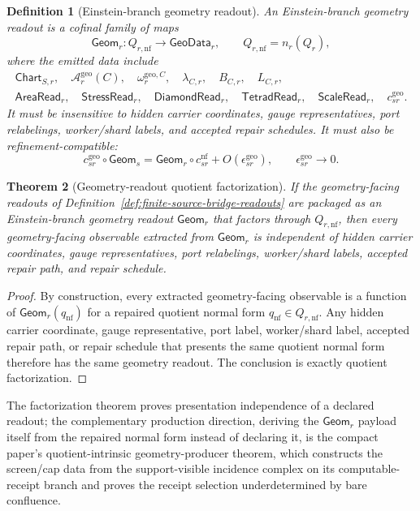 \documentclass[11pt]{article}
\newtheorem{theorem}{Theorem}[section]
\newtheorem{definition}[theorem]{Definition}
\theoremstyle{remark}
\theoremstyle{plain}
\begin{document}
\begin{definition}[Einstein-branch geometry readout]\label{def:einstein-branch-geometry-readout}
An Einstein-branch geometry readout is a cofinal family of maps
\[
\mathsf{Geom}_r:Q_{r,\mathrm{nf}}\to \mathsf{GeoData}_r,
\qquad
Q_{r,\mathrm{nf}}=n_r(Q_r),
\]
where the emitted data include
\[
\begin{gathered}
\mathsf{Chart}_{S,r},\quad
\mathcal A^{\mathrm{geo}}_{r}(C),\quad
\omega^{\mathrm{geo},C}_{r},\quad
\lambda_{C,r},\quad B_{C,r},\quad L_{C,r},\\
\mathsf{AreaRead}_r,\quad
\mathsf{StressRead}_r,\quad
\mathsf{DiamondRead}_r,\quad
\mathsf{TetradRead}_r,\quad
\mathsf{ScaleRead}_r,\quad
c^{\mathrm{geo}}_{sr}.
\end{gathered}
\]
It must be insensitive to hidden carrier coordinates, gauge representatives,
port relabelings, worker/shard labels, and accepted repair schedules. It must
also be refinement-compatible:
\[
c^{\mathrm{geo}}_{sr}\circ \mathsf{Geom}_s
=
\mathsf{Geom}_r\circ c^{\mathrm{nf}}_{sr}
+O(\epsilon^{\mathrm{geo}}_{sr}),
\qquad
\epsilon^{\mathrm{geo}}_{sr}\to0.
\]
\end{definition}

\begin{theorem}[Geometry-readout quotient factorization]\label{claim:geometry-readout-factorization}
If the geometry-facing readouts of
Definition~\ref{def:finite-source-bridge-readouts} are packaged as an
Einstein-branch geometry readout \(\mathsf{Geom}_r\) that factors through
\(Q_{r,\mathrm{nf}}\), then every geometry-facing observable extracted from
\(\mathsf{Geom}_r\) is independent of hidden carrier coordinates, gauge
representatives, port relabelings, worker/shard labels, accepted repair path,
and repair schedule.
\end{theorem}

\begin{proof}
By construction, every extracted geometry-facing observable is a function of
\(\mathsf{Geom}_r(q_{\mathrm{nf}})\) for a repaired quotient normal form
\(q_{\mathrm{nf}}\in Q_{r,\mathrm{nf}}\). Any hidden carrier coordinate, gauge
representative, port label, worker/shard label, accepted repair path, or repair
schedule that presents the same quotient normal form therefore has the same
geometry readout. The conclusion is exactly quotient factorization.
\end{proof}

The factorization theorem proves presentation independence of a declared readout; the
complementary production direction, deriving the \(\mathsf{Geom}_r\) payload itself from the
repaired normal form instead of declaring it, is the compact paper's quotient-intrinsic
geometry-producer theorem, which constructs the screen/cap data from the support-visible
incidence complex on its computable-receipt branch and proves the receipt selection
underdetermined by bare confluence.
\end{document}
